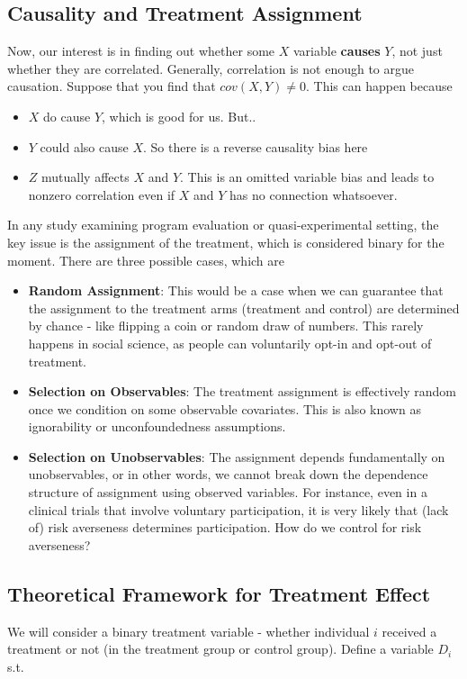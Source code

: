 \documentclass[12pt]{article}
\theoremstyle{definition}
\theoremstyle{property}
\theoremstyle{assumption}
\theoremstyle{example}
\theoremstyle{comment}
\begin{document}
\subsection{Causality and Treatment Assignment}
Now, our interest is in finding out whether some $X$ variable \textbf{causes} $Y$, not just whether they are correlated. Generally, correlation is not enough to argue causation. Suppose that you find that $cov(X,Y)\neq0$. This can happen because
\begin{itemize}
\item $X$ do cause $Y$, which is good for us. But..
\item $Y$ could also cause $X$. So there is a reverse causality bias here
\item $Z$ mutually affects $X$ and $Y$. This is an omitted variable bias and leads to nonzero correlation even if $X$ and $Y$ has no connection whatsoever. 
\end{itemize} \par
In any study examining program evaluation or quasi-experimental setting, the key issue is the assignment of the treatment, which is considered binary for the moment. There are three possible cases, which are
\begin{itemize}
\item \textbf{Random Assignment}: This would be a case when we can guarantee that the assignment to the treatment arms (treatment and control) are determined by chance - like flipping a coin or random draw of numbers. This rarely happens in social science, as people can voluntarily opt-in and opt-out of treatment. 
\item \textbf{Selection on Observables}: The treatment assignment is effectively random once we condition on some observable covariates. This is also known as ignorability or unconfoundedness assumptions.
\item \textbf{Selection on Unobservables}: The assignment depends fundamentally on unobservables, or in other words, we cannot break down the dependence structure of assignment using observed variables. For instance, even in a clinical trials that involve voluntary participation, it is very likely that (lack of) risk averseness determines participation. How do we control for risk averseness?
\end{itemize}
\subsection{Theoretical Framework for Treatment Effect}
We will consider a binary treatment variable - whether individual $i$ received a treatment or not (in the treatment group or control group). Define a variable $D_i$ s.t.
\end{document}
